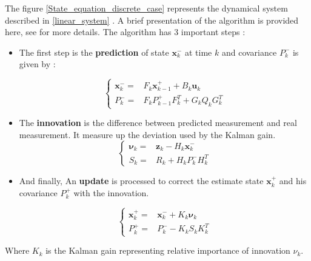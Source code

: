 \vspace{0.2cm}


The figure \ref{State_equation_discrete_case} represents the dynamical system described in \ref{linear_system} . A brief presentation of the algorithm is provided here,  see \cite{terejanu2013discrete} for more details. The algorithm has 3 important steps :\\



\begin{itemize}
\item The first step is the \textbf{prediction} of state $\textbf{x}^-_{k}$ at time $k$ and covariance $P^-_{k}$ is given by :

\begin{equation}
\left\{ \begin{array}{cl}
\textbf{x}^-_{k} = & F_{k}\textbf{x}^+_{k-1} + B_{k}\textbf{u}_{k} \\
P^-_{k} = & F_{k}P^+_{k-1}F^T_{k}+G_{k}Q_{k}G^T_{k}
\end{array}
\right.
\end{equation}

\item The \textbf{innovation} is the difference between predicted measurement and real measurement. It measure up the deviation used by the Kalman gain.
\begin{equation}
\left\{ \begin{array}{cl}
\boldsymbol\nu_{k} = & \textbf{z}_{k}-H_{k}\textbf{x}^-_{k} \\
S_{k} = & R_{k} +H_{k}P^-_{k}H^T_{k}
\end{array}
\right.
\end{equation}

\item And finally, An \textbf{update} is processed to correct the estimate state $\textbf{x}^+_{k} $ and his covariance $P^+_{k}$ with the innovation.

\begin{equation}
\left\{ \begin{array}{cl}
\textbf{x}^+_{k} = & \textbf{x}^-_{k} + K_{k}\boldsymbol\nu_{k} \\
P^+_{k} = &P^-_{k} - K_{k}S_{k}K^T_{k}
\end{array}
\right.
\end{equation}

\end{itemize}

Where $K_k$ is the Kalman gain  representing relative importance of innovation  $\nu_{k}$. 

